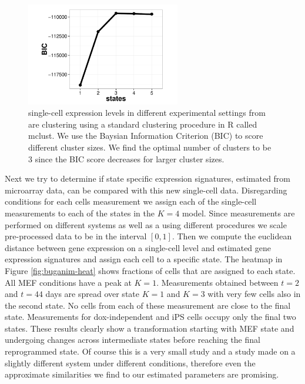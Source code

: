\begin{figure}[!t]
  \centering
  \includegraphics[width=0.6\textwidth]{pics/yossi_mclust.pdf}
  \caption{single-cell expression levels in different experimental settings from \cite{Buganim:2012hp} are clustering using a standard clustering procedure in R called mclust. We use the Baysian Information Criterion (BIC) to score different cluster sizes. We find the optimal number of clusters to be $3$ since the BIC score decreases for larger cluster sizes.}
  \label{fig:buganim-mclust}
\end{figure}

Next we try to determine if state specific expression signatures, estimated from microarray data, can be compared with this new single-cell data. Disregarding conditions for each cells measurement we assign each of the single-cell measurements to each of the states in the $K=4$ model. Since measurements are performed on different systems as well as a using different procedures we scale pre-processed data to be in the interval $[0, 1]$. Then we compute the euclidean distance between gene expression on a single-cell level and estimated gene expression signatures and assign each cell to a specific state. The heatmap in Figure \ref{fig:buganim-heat} shows fractions of cells that are assigned to each state. All MEF conditions have a peak at $K=1$. Measurements obtained between $t=2$ and $t=44$ days are spread over state $K=1$ and $K=3$ with very few cells also in the second state. No cells from each of these measurement are close to the final state. Measurements for dox-independent and iPS cells occupy only the final two states. These results clearly show a transformation starting with MEF state and undergoing changes across intermediate states before reaching the final reprogrammed state. Of course this is a very small study and a study made on a slightly different system under different conditions, therefore even the approximate similarities we find to our estimated parameters are promising.

